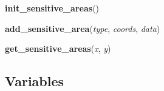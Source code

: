 \hspace{.8\funcindent}\begin{boxedminipage}{\funcwidth}

    \raggedright \textbf{init\_sensitive\_areas}()

\setlength{\parskip}{2ex}
\setlength{\parskip}{1ex}
    \end{boxedminipage}

    \label{pygtk_chart:chart:add_sensitive_area}

    \vspace{0.5ex}

\hspace{.8\funcindent}\begin{boxedminipage}{\funcwidth}

    \raggedright \textbf{add\_sensitive\_area}(\textit{type}, \textit{coords}, \textit{data})

\setlength{\parskip}{2ex}
\setlength{\parskip}{1ex}
    \end{boxedminipage}

    \label{pygtk_chart:chart:get_sensitive_areas}

    \vspace{0.5ex}

\hspace{.8\funcindent}\begin{boxedminipage}{\funcwidth}

    \raggedright \textbf{get\_sensitive\_areas}(\textit{x}, \textit{y})

\setlength{\parskip}{2ex}
\setlength{\parskip}{1ex}
    \end{boxedminipage}



  \subsection{Variables}

